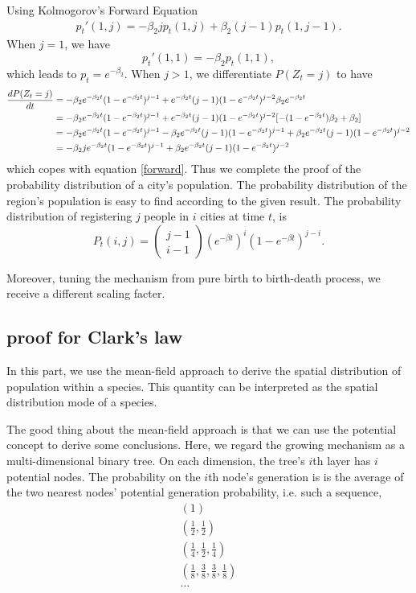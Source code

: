 \documentclass[aps,prl]{revtex4-2}
\begin{document}
Using Kolmogorov’s Forward Equation
\begin{align}p_t'(1,j) = -\beta_2 j p_t(1,j) + \beta_2 (j-1) p_t(1,j-1).\label{forward}\end{align}  When $j = 1$, we have \[p_t'(1,1) = -\beta_2 p_t(1,1), \] which leads to $p_t=e^{-\beta_2}$. When $j>1$, we differentiate $P(Z_t = j)$ to have 
\begin{align}
	\frac{dP(Z_t = j)}{dt} &= -\beta_2e^{-\beta_2 t} (1-e^{-\beta_2 t})^{j-1} + e^{-\beta_2 t}(j-1)(1-e^{-\beta_2 t})^{j-2}\beta_2 e^{-\beta_2 t}\notag\\
	&= -\beta_2 e^{-\beta_2 t}(1-e^{-\beta_2 t})^{j-1} + e^{-\beta_2 t}(j-1)(1-e^{-\beta_2 t})^{j-2} [-(1-e^{-\beta_2 t})\beta_2+\beta_2]\notag\\
	&= -\beta_2 e^{-\beta_2 t}(1-e^{-\beta_2 t})^{j-1} -\beta_2 e^{-\beta_2 t}(j-1)(1-e^{-\beta_2 t})^{j-1} +\beta_2e^{-\beta_2 t}(j-1)(1-e^{-\beta_2 t})^{j-2}\notag\\
	&= -\beta_2 j e^{-\beta_2 t}(1-e^{-\beta_2 t})^{j-1} +\beta_2e^{-\beta_2 t}(j-1)(1-e^{-\beta_2 t})^{j-2}
\end{align}
which copes with equation \ref{forward}. Thus we complete the proof of the probability distribution of a city's population. The probability distribution of the region's population is easy to find according to the given result. The probability distribution of registering $j$ people in $i$ cities at time $t$, is \[ P_t(i,j) = \left(\begin{array}{c}{j-1} \\ {i-1}\end{array}\right)\left(e^{-\beta t}\right)^{i}\left(1-e^{-\beta t}\right)^{j-i}. \]

Moreover, tuning the mechanism from pure birth to birth-death process, we receive a different scaling facter.

\subsection{proof for Clark's law}

In this part, we use the mean-field approach to derive the spatial distribution of population within a species. This quantity can be interpreted as the spatial distribution mode of a species. 

The good thing about the mean-field approach is that we can use the potential concept to derive some conclusions. Here, we regard the growing mechanism as a multi-dimensional binary tree. On each dimension, the tree's $i$th layer has $i$ potential nodes. The probability on the $i$th node's generation is is the average of the two nearest nodes' potential generation probability, i.e. such a sequence,
\begin{align*}
(1)\\
(\frac{1}{2},\frac{1}{2})\\
(\frac{1}{4},\frac{1}{2},\frac{1}{4})\\
(\frac{1}{8},\frac{3}{8},\frac{3}{8},\frac{1}{8})\\
\dots
\end{align*}
\end{document}
